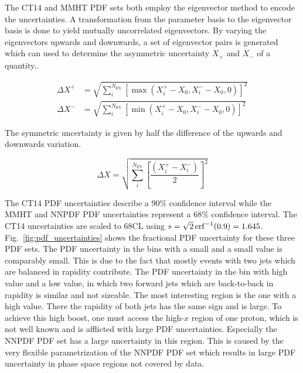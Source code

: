 The CT14 and MMHT PDF sets both employ the eigenvector method to encode the
uncertainties. A transformation from the parameter basis to the eigenvector
basis is done to yield mutually uncorrelated eigenvectors. By varying the
eigenvectors upwards and downwards, a set of eigenvector pairs is generated which can used to
determine the asymmetric uncertainty $X_+$ and $X_-$ of a quantity..

\begin{equation*}
\begin{aligned}
\Delta X^+ &= \sqrt{\sum_i^{N_{\mathrm{EV}}} \left[ \max(X_i^+ -X_0, X_i^- - X_0, 0)\right]^2}\\
\Delta X^- &= \sqrt{\sum_i^{N_{\mathrm{EV}}} \left[ \min(X_i^+ -X_0, X_i^- - X_0,0)\right]^2}
\end{aligned}
\end{equation*}

The symmetric uncertainty is given by half the difference of the upwards and
downwards variation.

\begin{equation*}
    \Delta X = \sqrt{\sum_i^{N_{\mathrm{EV}}} \left[ \frac{\left( X_i^+ -
    X_i^-\right)}{2} \right]^2}
\end{equation*}

The CT14 PDF uncertainties describe a 90\% confidence interval while the MMHT
and NNPDF PDF uncertainties represent a 68\% confidence interval. The CT14
uncertainties are scaled to 68CL using $s = \sqrt{2} \operatorname{erf}^{-1}(0.9) = 1.645$.
Fig.~\ref{fig:pdf_uncertainties} shows the fractional PDF uncertainty for
these three PDF sets. The PDF uncertainty in the bins with a small \ystar and a
small \yboost value is comparably small. This is due to the fact that mostly
events with two jets which are balanced in rapidity contribute. The PDF
uncertainty in the bin with high \ystar value and a low \yboost value, in which
two forward jets which are back-to-back in rapidity is similar and not sizeable.
The most interesting region is the one with a high \yboost value. There the
rapidity of both jets has the same sign and is large. To achieve this high boost, one
must access the high-$x$ region of one proton, which is not well known and is
afflicted with large PDF uncertainties. Especially the NNPDF PDF set has a large
uncertainty in this region. This is caused by the very flexible parametrization
of the NNPDF PDF set which results in large PDF uncertainty in phase space
regions not covered by data.


